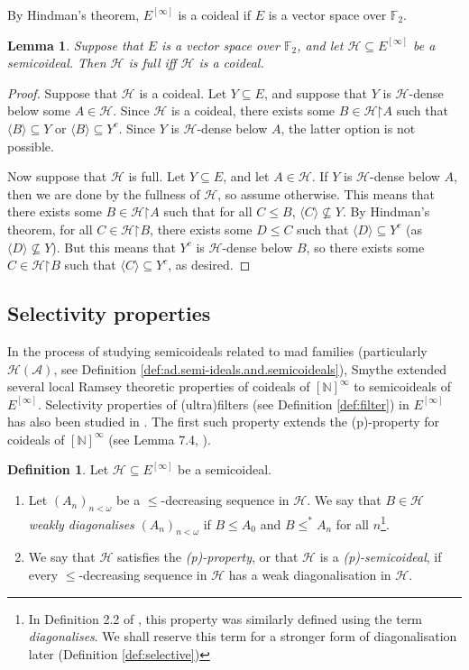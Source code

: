 \documentclass[10pt,a4paper]{amsart}
\theoremstyle{plain}
\numberwithin{equation}{section}
\newtheorem{lemma}[theorem]{Lemma}
\theoremstyle{definition}
\newtheorem{definition}[theorem]{Definition}
\renewcommand{\c}[1]{\langle #1 \rangle}
\newcommand{\N}{\mathbb{N}}
\newcommand{\cal}{\mathcal}
\newcommand{\A}{\cal{A}}
\newcommand{\restrictedto}{\mathord{\upharpoonright}}
\renewcommand{\H}{\cal{H}}
\begin{document}
By Hindman's theorem, $E^{[\infty]}$ is a coideal if $E$ is a vector space over $\mathbb{F}_2$.

\begin{lemma}
\label{lem:full.iff.coideal}
    Suppose that $E$ is a vector space over $\mathbb{F}_2$, and let $\H \subseteq E^{[\infty]}$ be a semicoideal. Then $\H$ is full iff $\H$ is a coideal.
\end{lemma}

\begin{proof}
    Suppose that $\H$ is a coideal. Let $Y \subseteq E$, and suppose that $Y$ is $\H$-dense below some $A \in \H$. Since $\H$ is a coideal, there exists some $B \in \H\restrictedto A$ such that $\c{B} \subseteq Y$ or $\c{B} \subseteq Y^c$. Since $Y$ is $\H$-dense below $A$, the latter option is not possible.

    Now suppose that $\H$ is full. Let $Y \subseteq E$, and let $A \in \H$. If $Y$ is $\H$-dense below $A$, then we are done by the fullness of $\H$, so assume otherwise. This means that there exists some $B \in \H\restrictedto A$ such that for all $C \leq B$, $\c{C} \not\subseteq Y$. By Hindman's theorem, for all $C \in \H\restrictedto B$, there exists some $D \leq C$ such that $\c{D} \subseteq Y^c$ (as $\c{D} \not\subseteq Y$). But this means that $Y^c$ is $\H$-dense below $B$, so there exists some $C \in \H\restrictedto B$ such that $\c{C} \subseteq Y^c$, as desired.
\end{proof}

\subsection{Selectivity properties}
In the process of studying semicoideals related to mad families (particularly $\H(\A)$, see Definition \ref{def:ad.semi-ideals.and.semicoideals}), Smythe extended several local Ramsey theoretic properties of coideals of $[\N]^\infty$ to semicoideals of $E^{[\infty]}$. Selectivity properties of (ultra)filters (see Definition \ref{def:filter}) in $E^{[\infty]}$ has also been studied in \cite{S23}.  The first such property extends the (p)-property for coideals of $[\N]^\infty$ (see Lemma 7.4, \cite{T10}).

\begin{definition}
\label{def:(p)-semicoideal}
    Let $\H \subseteq E^{[\infty]}$ be a semicoideal.
    \begin{enumerate}
        \item Let $(A_n)_{n<\omega}$ be a $\leq$-decreasing sequence in $\H$. We say that $B \in \H$ \emph{weakly diagonalises} $(A_n)_{n<\omega}$ if $B \leq A_0$ and $B \leq^* A_n$ for all $n$\footnote{In Definition 2.2 of \cite{S18}, this property was similarly defined using the term \emph{diagonalises}. We shall reserve this term for a stronger form of diagonalisation later (Definition \ref{def:selective})}.

        \item We say that $\H$ satisfies the \emph{(p)-property}, or that $\H$ is a \emph{(p)-semicoideal}, if every $\leq$-decreasing sequence in $\H$ has a weak diagonalisation in $\H$.
    \end{enumerate}
\end{definition}
\end{document}
